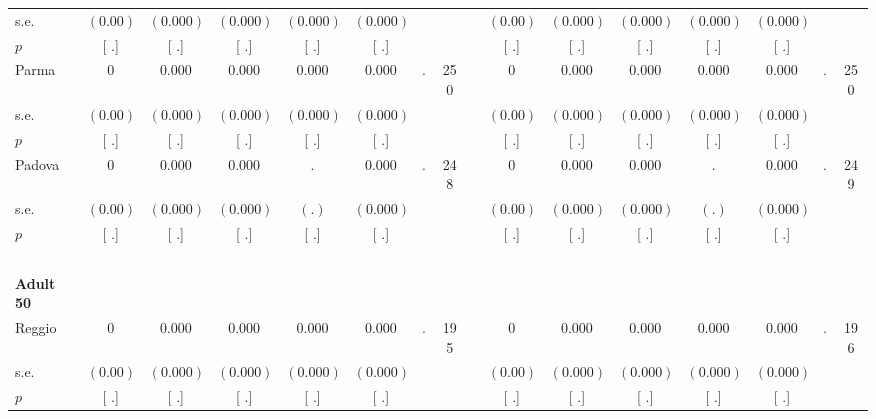\begin{longtable}{L{8em} c c c c c c c p{1em} c c c c c c c}
\quad \quad \quad \quad s.e.& $ (     0.00)$ & $ (    0.000)$ & $ (    0.000)$ & $ (    0.000)$ & $ (    0.000)$ & & & & $ (     0.00)$ & $ (    0.000)$ & $ (    0.000)$ & $ (    0.000)$ & $ (    0.000)$ & &  \\*
\quad \quad \quad \quad $ p$ & [        .] & [        .] & [        .] & [        .] & [        .] & & & & [        .] & [        .] & [        .] & [        .] & [        .] & &  \\[1em]
\quad \quad \quad Parma& 0 &     0.000 &     0.000 &     0.000 &     0.000 &         . &       250 & & 0 &     0.000 &     0.000 &     0.000 &     0.000 &         . &       250  \\*
\quad \quad \quad \quad s.e.& $ (     0.00)$ & $ (    0.000)$ & $ (    0.000)$ & $ (    0.000)$ & $ (    0.000)$ & & & & $ (     0.00)$ & $ (    0.000)$ & $ (    0.000)$ & $ (    0.000)$ & $ (    0.000)$ & &  \\*
\quad \quad \quad \quad $ p$ & [        .] & [        .] & [        .] & [        .] & [        .] & & & & [        .] & [        .] & [        .] & [        .] & [        .] & &  \\[1em]
\quad \quad \quad Padova& 0 &     0.000 &     0.000 &         . &     0.000 &         . &       248 & & 0 &     0.000 &     0.000 &         . &     0.000 &         . &       249  \\*
\quad \quad \quad \quad s.e.& $ (     0.00)$ & $ (    0.000)$ & $ (    0.000)$ & $ (        .)$ & $ (    0.000)$ & & & & $ (     0.00)$ & $ (    0.000)$ & $ (    0.000)$ & $ (        .)$ & $ (    0.000)$ & &  \\*
\quad \quad \quad \quad $ p$ & [        .] & [        .] & [        .] & [        .] & [        .] & & & & [        .] & [        .] & [        .] & [        .] & [        .] & &  \\[1em]
~\\[1em]
\quad \quad \textbf{Adult 50} & & & & & & & & & & & & & & & \\* 
\quad \quad \quad Reggio& 0 &     0.000 &     0.000 &     0.000 &     0.000 &         . &       195 & & 0 &     0.000 &     0.000 &     0.000 &     0.000 &         . &       196  \\*
\quad \quad \quad \quad s.e.& $ (     0.00)$ & $ (    0.000)$ & $ (    0.000)$ & $ (    0.000)$ & $ (    0.000)$ & & & & $ (     0.00)$ & $ (    0.000)$ & $ (    0.000)$ & $ (    0.000)$ & $ (    0.000)$ & &  \\*
\quad \quad \quad \quad $ p$ & [        .] & [        .] & [        .] & [        .] & [        .] & & & & [        .] & [        .] & [        .] & [        .] & [        .] & &  \\[1em]

\end{longtable}
